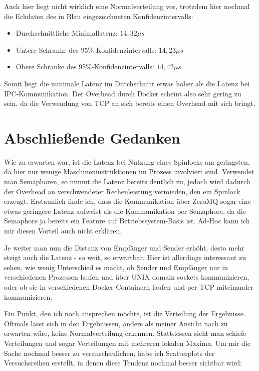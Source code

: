 \documentclass[12pt]{article}
\begin{document}
Auch hier liegt nicht wirklich eine Normalverteilung vor, trotzdem hier nochmal die Eckdaten des in Blau eingezeichneten Konfidenzintervalls:

\begin{itemize}
	\item Durchschnittliche Minimallatenz: $14,32 \mu s$
	\item Untere Schranke des 95\%-Konfidenzintervalls: $14,23 \mu s$
	\item Obere Schranke des 95\%-Konfidenzintervalls: $14,42 \mu s$
\end{itemize}

Somit liegt die minimale Latenz im Durchschnitt etwas höher als die Latenz bei IPC-Kommunikation. 
Der Overhead durch Docker scheint also sehr gering zu sein, da die Verwendung von TCP an sich bereits einen Overhead mit sich bringt.

\section{Abschließende Gedanken}
Wie zu erwarten war, ist die Latenz bei Nutzung eines Spinlocks am geringsten, da hier nur wenige Maschineninstruktionen im Prozess involviert sind.
Verwendet man Semaphoren, so nimmt die Latenz bereits deutlich zu, jedoch wird dadurch der Overhead an verschwendeter Rechenleistung vermieden, den ein Spinlock erzeugt.
Erstaunlich finde ich, dass die Kommunikation über ZeroMQ sogar eine etwas geringere Latenz aufweist als die Kommunikation per Semaphore, da die Semaphore ja bereits ein Feature auf Betriebssystem-Basis ist.
Ad-Hoc kann ich mir diesen Vorteil auch nicht erklären.

Je weiter man nun die Distanz von Empfänger und Sender erhöht, desto mehr steigt auch die Latenz - so weit, so erwartbar.
Hier ist allerdings interessant zu sehen, wie wenig Unterschied es macht, ob Sender und Empfänger nur in verschiedenen Prozessen laufen und über UNIX domain sockets kommunizieren, oder ob sie in verschiedenen Docker-Containern laufen und per TCP miteinander kommunizieren.

Ein Punkt, den ich noch ansprechen möchte, ist die Verteilung der Ergebnisse. 
Oftmals lässt sich in den Ergebnissen, anders als meiner Ansicht nach zu erwarten wäre, keine Normalverteilung erkennen. 
Stattdessen sieht man schiefe Verteilungen und sogar Verteilungen mit mehreren lokalen Maxima.
Um mir die Sache nochmal besser zu veranschaulichen, habe ich Scatterplots der Versuchsreihen erstellt, in denen diese Tendenz nochmal besser sichtbar wird:
\end{document}

